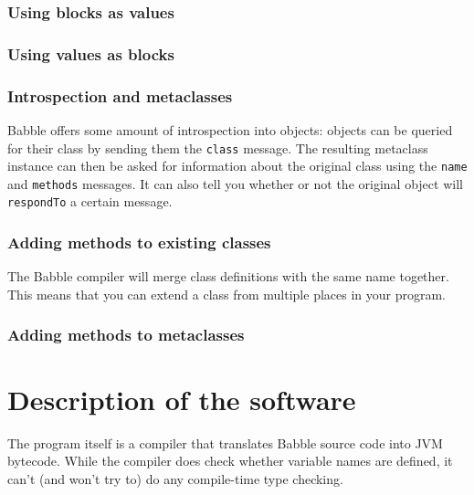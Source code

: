 \documentclass[a4paper]{article}
\begin{document}
\subsubsection{Using blocks as values}

\subsubsection{Using values as blocks}

\subsubsection{Introspection and metaclasses}

Babble offers some amount of introspection into objects: objects can be queried for their class by sending them the \texttt{class} message.
The resulting metaclass instance can then be asked for information about the original class using the \texttt{name} and \texttt{methods} messages.
It can also tell you whether or not the original object will \texttt{respondTo} a certain message.

\label{merge}
\subsubsection{Adding methods to existing classes}

The Babble compiler will merge class definitions with the same name together.
This means that you can extend a class from multiple places in your program.

\subsubsection{Adding methods to metaclasses}

\section{Description of the software}

The program itself is a compiler that translates Babble source code into JVM bytecode.
While the compiler does check whether variable names are defined, it can't (and won't try to) do any compile-time type checking.
\end{document}
